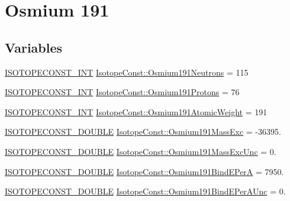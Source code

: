 \hypertarget{group___isotope_const-_osmium-_os191}{}\section{Osmium 191}
\label{group___isotope_const-_osmium-_os191}
\subsection*{Variables}
\begin{DoxyCompactItemize}
\item 
\mbox{\hyperlink{group___isotope_const-_macros_ga5f18360b3e99483a35c32d789e62621c}{I\+S\+O\+T\+O\+P\+E\+C\+O\+N\+S\+T\+\_\+\+I\+NT}} \mbox{\hyperlink{group___isotope_const-_osmium-_os191_gab047b982ac6688294ae263e260a998d9}{Isotope\+Const\+::\+Osmium191\+Neutrons}} = 115
\item 
\mbox{\hyperlink{group___isotope_const-_macros_ga5f18360b3e99483a35c32d789e62621c}{I\+S\+O\+T\+O\+P\+E\+C\+O\+N\+S\+T\+\_\+\+I\+NT}} \mbox{\hyperlink{group___isotope_const-_osmium-_os191_ga0d92d3e11b6e7a59638a4e1aa3d33142}{Isotope\+Const\+::\+Osmium191\+Protons}} = 76
\item 
\mbox{\hyperlink{group___isotope_const-_macros_ga5f18360b3e99483a35c32d789e62621c}{I\+S\+O\+T\+O\+P\+E\+C\+O\+N\+S\+T\+\_\+\+I\+NT}} \mbox{\hyperlink{group___isotope_const-_osmium-_os191_gab7eecec4766ab87f09895e927b5bc1e2}{Isotope\+Const\+::\+Osmium191\+Atomic\+Weight}} = 191
\item 
\mbox{\hyperlink{group___isotope_const-_macros_ga8f45a7272ce02c0b4c65c44636ed719a}{I\+S\+O\+T\+O\+P\+E\+C\+O\+N\+S\+T\+\_\+\+D\+O\+U\+B\+LE}} \mbox{\hyperlink{group___isotope_const-_osmium-_os191_gac6082ff66ce1ecaf09d5f52c799f5857}{Isotope\+Const\+::\+Osmium191\+Mass\+Exc}} = -\/36395.
\item 
\mbox{\hyperlink{group___isotope_const-_macros_ga8f45a7272ce02c0b4c65c44636ed719a}{I\+S\+O\+T\+O\+P\+E\+C\+O\+N\+S\+T\+\_\+\+D\+O\+U\+B\+LE}} \mbox{\hyperlink{group___isotope_const-_osmium-_os191_ga39577cb129583a40712588be4d18f841}{Isotope\+Const\+::\+Osmium191\+Mass\+Exc\+Unc}} = 0.
\item 
\mbox{\hyperlink{group___isotope_const-_macros_ga8f45a7272ce02c0b4c65c44636ed719a}{I\+S\+O\+T\+O\+P\+E\+C\+O\+N\+S\+T\+\_\+\+D\+O\+U\+B\+LE}} \mbox{\hyperlink{group___isotope_const-_osmium-_os191_ga2ca183a79c07176dba23eac2dffaa2da}{Isotope\+Const\+::\+Osmium191\+Bind\+E\+PerA}} = 7950.
\item 
\mbox{\hyperlink{group___isotope_const-_macros_ga8f45a7272ce02c0b4c65c44636ed719a}{I\+S\+O\+T\+O\+P\+E\+C\+O\+N\+S\+T\+\_\+\+D\+O\+U\+B\+LE}} \mbox{\hyperlink{group___isotope_const-_osmium-_os191_gadb8ec6efdeda93090bd1d236b11d30c8}{Isotope\+Const\+::\+Osmium191\+Bind\+E\+Per\+A\+Unc}} = 0.

\end{DoxyCompactItemize}
